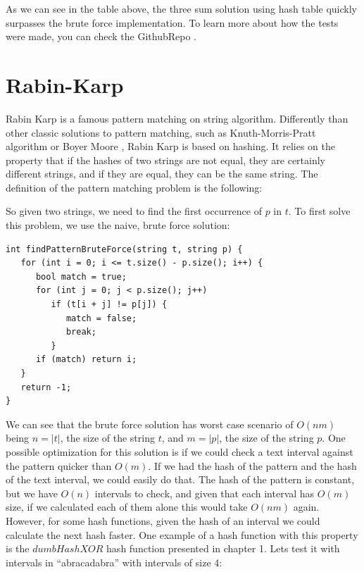 \bigskip

As we can see in the table above, the three sum solution using hash table quickly surpasses the brute force implementation. To learn more about how the tests were made, you can check the GithubRepo \citep{GithubRepo}.

\section{Rabin-Karp}

Rabin Karp is a famous pattern matching on string algorithm. Differently than other classic solutions to pattern matching, such as Knuth-Morris-Pratt \citep{KMSWiki} algorithm or Boyer Moore \citep{BMWiki}, Rabin Karp is based on hashing. It relies on the property that if the hashes of two strings are not equal, they are certainly different strings, and if they are equal, they can be the same string. The definition of the pattern matching problem is the following:

\medskip


So given two strings, we need to find the first occurrence of \( p \) in \( t \). To first solve this problem, we use the naive, brute force solution:

\begin{lstlisting}
int findPatternBruteForce(string t, string p) {
   for (int i = 0; i <= t.size() - p.size(); i++) {
      bool match = true;
      for (int j = 0; j < p.size(); j++)
         if (t[i + j] != p[j]) {
            match = false;
            break;
         }
      if (match) return i;
   }
   return -1;
}
\end{lstlisting}

We can see that the brute force solution has worst case scenario of \( O(nm) \) being \( n = |t| \), the size of the string \( t \), and \( m = |p| \), the size of the string \( p \). One possible optimization for this solution is if we could check a text interval against the pattern quicker than \( O(m) \). If we had the hash of the pattern and the hash of the text interval, we could easily do that. The hash of the pattern is constant, but we have \( O(n) \) intervals to check, and given that each interval has \( O(m) \) size, if we calculated each of them alone this would take \( O(nm) \) again. However, for some hash functions, given the hash of an interval we could calculate the next hash faster. One example of a hash function with this property is the \( dumbHashXOR \) hash function presented in chapter 1. Lets test it with intervals in ``abracadabra'' with intervals of size 4:

